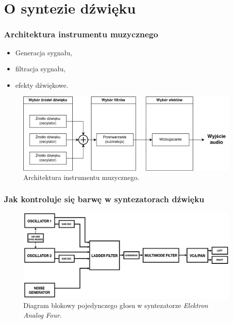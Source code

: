 \documentclass[]{beamer}
\begin{document}
\section{O syntezie dźwięku}

\begin{frame}
  \frametitle{Architektura instrumentu muzycznego}

  \begin{itemize}
    \item Generacja sygnału,
    \item filtracja sygnału,
    \item efekty dźwiękowe.
  \end{itemize}

  \begin{figure}
    \centering
    \includegraphics[width=0.7\linewidth]{synth_architecture.png}

    \caption{
      Architektura instrumentu muzycznego.
    }
  \end{figure}
\end{frame}

\begin{frame}
  \frametitle{Jak kontroluje się barwę w syntezatorach dźwięku}

  \begin{figure}
    \centering
    \includegraphics[width=0.9\linewidth]{analog_four_diagram.png}

    \caption{
      Diagram blokowy pojedynczego głosu w syntezatorze 
      \textit{Elektron Analog Four}.
    }
  \end{figure}
\end{frame}
\end{document}
